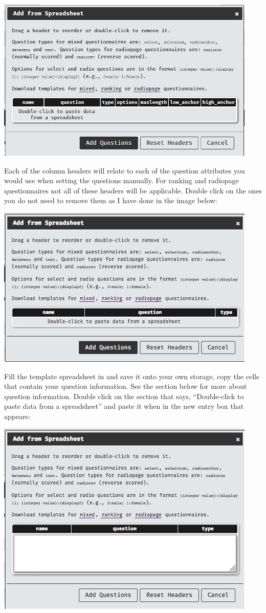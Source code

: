 \documentclass[]{book}
\begin{document}
\includegraphics{images/screenshots/quest_spread_1.png}

Each of the column headers will relate to each of the question attributes you would use when setting the questions manually. For ranking and radiopage questionnaires not all of these headers will be applicable. Double click on the ones you do not need to remove them as I have done in the image below:

\includegraphics{images/screenshots/quest_spread_2.png}

Fill the template spreadsheet in and save it onto your own storage, copy the cells that contain your question information. See the section below for more about question information.
Double click on the section that says, ``Double-click to paste data from a spreadsheet'' and paste it when in the new entry box that appears:

\includegraphics{images/screenshots/quest_spread_3.png}
\end{document}
